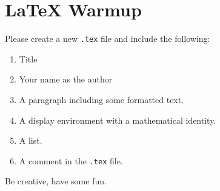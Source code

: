 \documentclass[11pt]{article}
\begin{document}
\section{LaTeX Warmup}

Please create a new \texttt{.tex} file and include the following:
\begin{enumerate}
    \item Title
    \item Your name as the author
    \item A paragraph including some formatted text.
    \item A display environment with a mathematical identity.
    \item A list.
    \item A comment in the \texttt{.tex} file.
\end{enumerate}
Be creative, have some fun.
\end{document}
